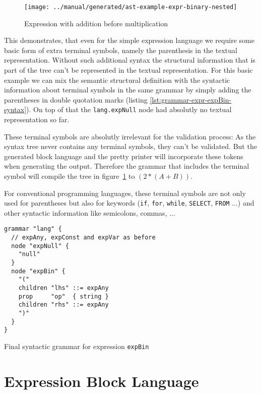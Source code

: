 \documentclass[sigconf,natbib=false,review=true,anonymous]{acmart}
\newcommand\astScale{0.75}
\begin{document}
\begin{figure}
  \texttt{[image: ../manual/generated/ast-example-expr-binary-nested]}
  \caption{Expression with addition before multiplication}
  \label{fig:ast-nested-ambiguous}
\end{figure}

This demonstrates, that even for the simple expression language we require some basic form of extra terminal symbols, namely the parenthesis in the textual representation. Without such additional syntax the structural information that is part of the tree can't be represented in the textual representation. For this basic example we can mix the semantic structural definition with the syntactic information about terminal symbols in the same grammar by simply adding the parentheses in double quotation marks (listing \ref{lst:grammar-expr-expBin-syntax}). On top of that the \texttt{lang.expNull} node had absolutly no textual representation so far.

These terminal symbols are absolutly irrelevant for the validation process: As the syntax tree never contains any terminal symbols, they can't be validated. But the generated block language and the pretty printer will incorporate these tokens when generating the output. Therefore the grammar that includes the terminal symbol will compile the tree in figure~\ref{fig:ast-nested-ambiguous} to $(2 * (A + B))$.

For conventional programming languages, these terminal symbols are not only used for parentheses but also for keywords (\texttt{if}, \texttt{for}, \texttt{while}, \texttt{SELECT}, \texttt{FROM} ...) and other syntactic information like semicolons, commas, ...

\begin{listing}[H]
\begin{verbatim}
grammar "lang" {
  // expAny, expConst and expVar as before
  node "expNull" {
    "null"
  }
  node "expBin" {
    "("
    children "lhs" ::= expAny
    prop     "op"  { string }
    children "rhs" ::= expAny
    ")"
  }
}
\end{verbatim}
\caption{Final syntactic grammar for expression \texttt{expBin}}
\label{lst:grammar-expr-expBin-syntax}
\end{listing}

\section{Expression Block Language}
\end{document}
